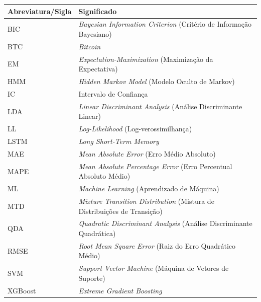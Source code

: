 \documentclass[
    12pt,                %
    openright,           %
    oneside,             %
    a4paper,             %
    english,             %
    brazil               %
]{abntex2}
\begin{document}
\begin{center}
\begin{tabular}{@{}p{3.2cm}p{}@{}}
\toprule
\textbf{Abreviatura/Sigla} & \textbf{Significado} \\
\midrule
BIC     & \emph{Bayesian Information Criterion} (Critério de Informação Bayesiano) \\
BTC     & \emph{Bitcoin} \\
EM      & \emph{Expectation-Maximization} (Maximização da Expectativa) \\
HMM     & \emph{Hidden Markov Model} (Modelo Oculto de Markov) \\
IC      & Intervalo de Confiança \\
LDA     & \emph{Linear Discriminant Analysis} (Análise Discriminante Linear) \\
LL      & \emph{Log-Likelihood} (Log-verossimilhança) \\
LSTM    & \emph{Long Short-Term Memory} \\
MAE     & \emph{Mean Absolute Error} (Erro Médio Absoluto) \\
MAPE    & \emph{Mean Absolute Percentage Error} (Erro Percentual Absoluto Médio) \\
ML      & \emph{Machine Learning} (Aprendizado de Máquina) \\
MTD     & \emph{Mixture Transition Distribution} (Mistura de Distribuições de Transição) \\
QDA     & \emph{Quadratic Discriminant Analysis} (Análise Discriminante Quadrática) \\
RMSE    & \emph{Root Mean Square Error} (Raiz do Erro Quadrático Médio) \\
SVM     & \emph{Support Vector Machine} (Máquina de Vetores de Suporte) \\
XGBoost & \emph{Extreme Gradient Boosting} \\
\bottomrule
\end{tabular}
\end{center}

\cleardoublepage

\tableofcontents*
\cleardoublepage

\textual
\end{document}
